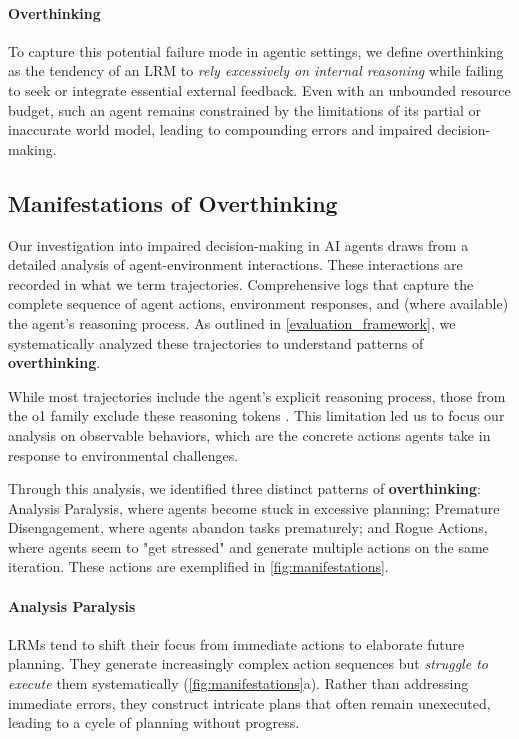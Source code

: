 \paragraph{Overthinking} To capture this potential failure mode in agentic settings, we define overthinking as the tendency of an LRM to \textit{rely excessively on internal reasoning} while failing to seek or integrate essential external feedback. Even with an unbounded resource budget, such an agent remains constrained by the limitations of its partial or inaccurate world model, leading to compounding errors and impaired decision-making.


\subsection{Manifestations of Overthinking}
\label{sec:manifestations}
Our investigation into impaired decision-making in AI agents draws from a detailed analysis of agent-environment interactions. These interactions are recorded in what we term trajectories. Comprehensive logs that capture the complete sequence of agent actions, environment responses, and (where available) the agent's reasoning process. As outlined in \cref{evaluation_framework}, we systematically analyzed these trajectories to understand patterns of \textbf{overthinking}.

While most trajectories include the agent's explicit reasoning process, those from the o1 family exclude these reasoning tokens \cite{openai_learning_to_reason_2024}. This limitation led us to focus our analysis on observable behaviors, which are the concrete actions agents take in response to environmental challenges.

Through this analysis, we identified three distinct patterns of \textbf{overthinking}: Analysis Paralysis, where agents become stuck in excessive planning; Premature Disengagement, where agents abandon tasks prematurely; and Rogue Actions, where agents seem to "get stressed" and generate multiple actions on the same iteration. These actions are exemplified in \cref{fig:manifestations}.

\paragraph{Analysis Paralysis} LRMs tend to shift their focus from immediate actions to elaborate future planning. They generate increasingly complex action sequences but \textit{struggle to execute} them systematically (\cref{fig:manifestations}a). Rather than addressing immediate errors, they construct intricate plans that often remain unexecuted, leading to a cycle of planning without progress.

